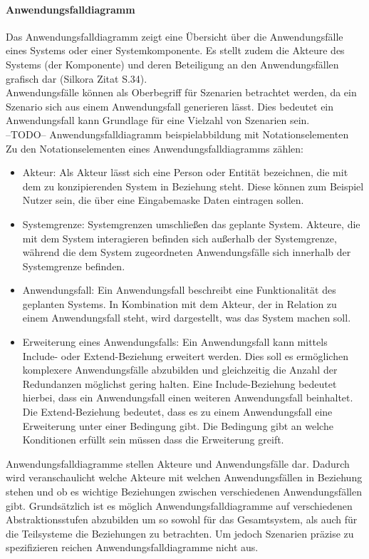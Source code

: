 \paragraph{Anwendungsfalldiagramm}
Das Anwendungsfalldiagramm zeigt eine \"Ubersicht \"uber die Anwendungsf\"alle eines Systems oder einer Systemkomponente. Es stellt zudem die Akteure des Systems (der Komponente) und deren Beteiligung an den Anwendungsf\"allen grafisch dar (Silkora Zitat S.34). \\

Anwendungsf\"alle k\"onnen als Oberbegriff f\"ur Szenarien betrachtet werden, da ein Szenario sich aus einem Anwendungsfall generieren l\"asst. Dies bedeutet ein Anwendungsfall kann Grundlage für eine Vielzahl von Szenarien sein. \\

--TODO-- Anwendungsfalldiagramm beispielabbildung mit Notationselementen\\

Zu den Notationselementen eines Anwendungsfalldiagramms z\"ahlen:
\begin{itemize}
\item Akteur: Als Akteur l\"asst sich eine Person oder Entit\"at bezeichnen, die mit dem zu konzipierenden System in Beziehung steht. Diese k\"onnen zum Beispiel Nutzer sein, die \"uber eine Eingabemaske Daten eintragen sollen.
\item Systemgrenze: Systemgrenzen umschlie\ss{}en das geplante System. Akteure, die mit dem System interagieren befinden sich au\ss{}erhalb der Systemgrenze, w\"ahrend die dem System zugeordneten Anwendungsf\"alle sich innerhalb der Systemgrenze befinden.
\item Anwendungsfall: Ein Anwendungsfall beschreibt eine Funktionalit\"at des geplanten Systems. In Kombination mit dem Akteur, der in Relation zu einem Anwendungsfall steht, wird dargestellt, was das System machen soll.
\item Erweiterung eines Anwendungsfalls: Ein Anwendungsfall kann mittels Include- oder Extend-Beziehung erweitert werden. Dies soll es erm\"oglichen komplexere Anwendungsf\"alle abzubilden und gleichzeitig die Anzahl der Redundanzen m\"oglichst gering halten. Eine Include-Beziehung bedeutet hierbei, dass ein Anwendungsfall einen weiteren Anwendungsfall beinhaltet. Die Extend-Beziehung bedeutet, dass es zu einem Anwendungsfall eine Erweiterung unter einer Bedingung gibt. Die Bedingung gibt an welche Konditionen erfüllt sein müssen dass die Erweiterung greift.
\end{itemize}
Anwendungsfalldiagramme stellen Akteure und Anwendungsfälle dar. Dadurch wird veranschaulicht welche Akteure mit welchen Anwendungsfällen in Beziehung stehen und ob es wichtige Beziehungen zwischen verschiedenen Anwendungsfällen gibt. Grundsätzlich ist es möglich Anwendungsfalldiagramme auf verschiedenen Abstraktionsstufen abzubilden um so sowohl für das Gesamtsystem, als auch für die Teilsysteme die Beziehungen zu betrachten. Um jedoch Szenarien präzise zu spezifizieren reichen Anwendungsfalldiagramme nicht aus.\\

